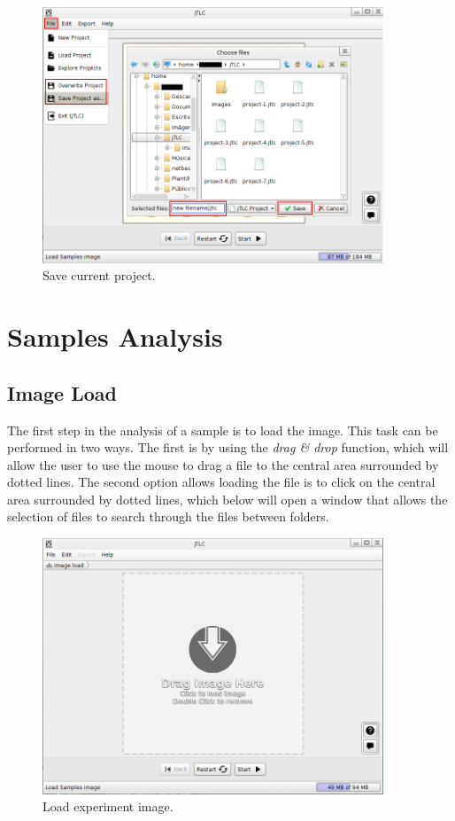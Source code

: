 \begin{figure}[H]
	\vspace{0cm}
	\centering
	\includegraphics[width=385px]{imagenes/save_project}
	\centering
	\vspace{-0.4cm}
	\caption{Save current project.}
	\label{fig:save_project}
	\vspace{-0.25cm}
\end{figure}
\newpage

\chapter{Samples Analysis}
\section{Image Load}
The first step in the analysis of a sample is to load the image. This task can be performed in two ways. The first is by using the \emph{drag \& drop} function, which will allow the user to use the mouse to drag a file to the central area surrounded by dotted lines. The second option allows loading the file is to click on the central area surrounded by dotted lines, which below will open a window that allows the selection of files to search through the files between folders.
\begin{figure}[H]
	\vspace{0cm}
	\centering
	\includegraphics[width=385px]{imagenes/drop}
	\centering
	\vspace{-0.4cm}
	\caption{Load experiment image.}
	\label{fig:image_load}
	\vspace{-0.25cm}
\end{figure}
\newpage

